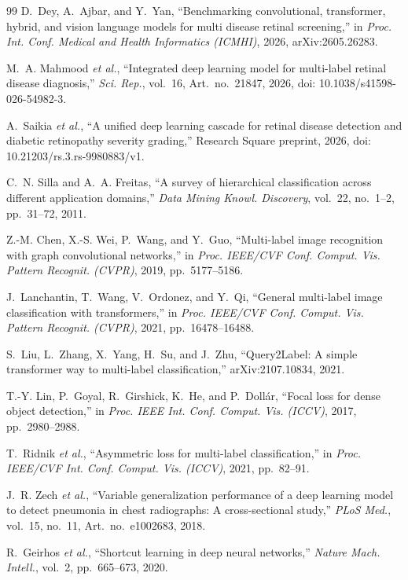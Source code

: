 \documentclass[conference]{IEEEtran}
\begin{document}
\begin{thebibliography}{99}
D.~Dey, A.~Ajbar, and Y.~Yan, ``Benchmarking convolutional, transformer, hybrid, and vision language models for multi disease retinal screening,'' in \emph{Proc. Int. Conf. Medical and Health Informatics (ICMHI)}, 2026, arXiv:2605.26283.

M.~A. Mahmood \emph{et al.}, ``Integrated deep learning model for multi-label retinal disease diagnosis,'' \emph{Sci. Rep.}, vol.~16, Art.~no.~21847, 2026, doi: 10.1038/s41598-026-54982-3.

A.~Saikia \emph{et al.}, ``A unified deep learning cascade for retinal disease detection and diabetic retinopathy severity grading,'' Research Square preprint, 2026, doi: 10.21203/rs.3.rs-9980883/v1.

C.~N. Silla and A.~A. Freitas, ``A survey of hierarchical classification across different application domains,'' \emph{Data Mining Knowl. Discovery}, vol.~22, no.~1--2, pp.~31--72, 2011.

Z.-M. Chen, X.-S. Wei, P.~Wang, and Y.~Guo, ``Multi-label image recognition with graph convolutional networks,'' in \emph{Proc. IEEE/CVF Conf. Comput. Vis. Pattern Recognit. (CVPR)}, 2019, pp.~5177--5186.

J.~Lanchantin, T.~Wang, V.~Ordonez, and Y.~Qi, ``General multi-label image classification with transformers,'' in \emph{Proc. IEEE/CVF Conf. Comput. Vis. Pattern Recognit. (CVPR)}, 2021, pp.~16478--16488.

S.~Liu, L.~Zhang, X.~Yang, H.~Su, and J.~Zhu, ``Query2Label: A simple transformer way to multi-label classification,'' arXiv:2107.10834, 2021.

T.-Y. Lin, P.~Goyal, R.~Girshick, K.~He, and P.~Doll\'ar, ``Focal loss for dense object detection,'' in \emph{Proc. IEEE Int. Conf. Comput. Vis. (ICCV)}, 2017, pp.~2980--2988.

T.~Ridnik \emph{et al.}, ``Asymmetric loss for multi-label classification,'' in \emph{Proc. IEEE/CVF Int. Conf. Comput. Vis. (ICCV)}, 2021, pp.~82--91.

J.~R. Zech \emph{et al.}, ``Variable generalization performance of a deep learning model to detect pneumonia in chest radiographs: A cross-sectional study,'' \emph{PLoS Med.}, vol.~15, no.~11, Art.~no.~e1002683, 2018.

R.~Geirhos \emph{et al.}, ``Shortcut learning in deep neural networks,'' \emph{Nature Mach. Intell.}, vol.~2, pp.~665--673, 2020.


\end{thebibliography}
\end{document}

